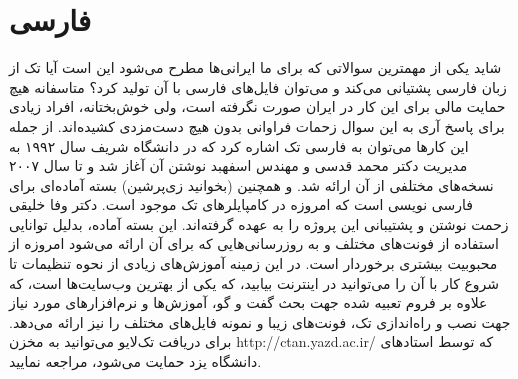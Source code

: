 \documentclass[a4paper,12pt]{report}
\begin{document}
\section*{فارسی}
شاید یکی از مهمترین سوالاتی که برای ما ایرانی‌ها مطرح می‌شود این است آیا تک از زبان فارسی پشتیانی می‌کند و می‌توان فایل‌های فارسی با آن تولید کرد؟ متاسفانه هیچ حمایت مالی برای این کار در ایران صورت نگرفته است، ولی خوش‌بختانه، افراد زیادی برای پاسخ آری به این سوال زحمات فراوانی بدون هیچ دست‌مزدی کشیده‌اند. از جمله این کارها می‌توان به فارسی تک اشاره کرد که در دانشگاه شریف سال  ۱۹۹۲ به مدیریت دکتر محمد قدسی و مهندس اسفهبد 
نوشتن آن آغاز شد و تا سال ۲۰۰۷ نسخه‌های مختلفی از آن ارائه شد. و همچنین 
\XePersian
(بخوانید زی‌پرشین) بسته آماده‌ای برای فارسی نویسی است که امروزه در کامپایلر‌های تک موجود است. دکتر وفا خلیقی زحمت نوشتن و پشتیبانی این پروژه را به عهده گرفته‌اند. این بسته آماده، بدلیل توانایی استفاده از فونت‌های مختلف و به روزرسانی‌هایی که برای آن ارائه می‌شود امروزه از محبوبیت بیشتری برخوردار است. در این زمینه آموزش‌های زیادی از نحوه تنظیمات تا شروع کار با آن را می‌توانید در اینترنت بیابید، 
که یکی از بهترین وب‌سایت‌ها  است، که علاوه بر فروم تعبیه شده جهت بحث گفت و گو، آموزش‌ها و نرم‌افزارهای مورد نیاز جهت نصب و راه‌اندازی تک، فونت‌های زیبا و نمونه فایل‌های مختلف را نیز ارائه می‌دهد.
 برای دریافت تک‌لایو می‌توانید به مخزن http://ctan.yazd.ac.ir/ که توسط استادهای دانشگاه یزد حمایت می‌شود، مراجعه نمایید.
\end{document}
